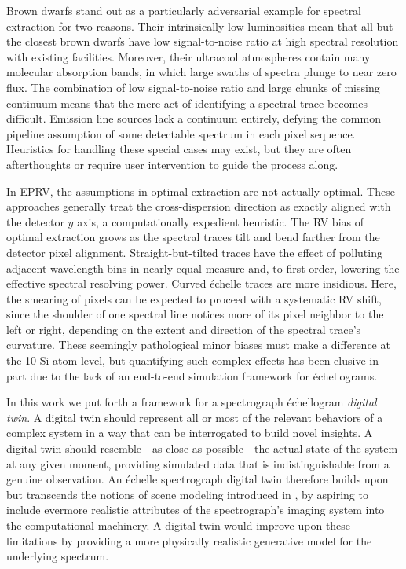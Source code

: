 \documentclass[twocolumn]{aastex63}
\begin{document}
Brown dwarfs stand out as a particularly adversarial example for spectral extraction for two reasons.  Their intrinsically low luminosities mean that all but the closest brown dwarfs have low signal-to-noise ratio at high spectral resolution with existing facilities.  Moreover, their ultracool atmospheres contain many molecular absorption bands, in which large swaths of spectra plunge to near zero flux.  The combination of low signal-to-noise ratio and large chunks of missing continuum means that the mere act of identifying a spectral trace becomes difficult. Emission line sources lack a continuum entirely, defying the common pipeline assumption of some detectable spectrum in each pixel sequence.  Heuristics for handling these special cases may exist, but they are often afterthoughts or require user intervention to guide the process along.

In EPRV, the assumptions in optimal extraction are not actually optimal.  These approaches generally treat the cross-dispersion direction as exactly aligned with the detector $y$ axis, a computationally expedient heuristic. The RV bias of optimal extraction grows as the spectral traces tilt and bend farther from the detector pixel alignment.  Straight-but-tilted traces have the effect of polluting adjacent wavelength bins in nearly equal measure and, to first order, lowering the effective spectral resolving power.  Curved \'echelle traces are more insidious.  Here, the smearing of pixels can be expected to proceed with a systematic RV shift, since the shoulder of one spectral line notices more of its pixel neighbor to the left or right, depending on the extent and direction of the spectral trace's curvature.  These seemingly pathological minor biases must make a difference at the 10 Si atom level, but quantifying such complex effects has been elusive in part due to the lack of an end-to-end simulation framework for \'echellograms.

In this work we put forth a framework for a spectrograph \'echellogram \emph{digital twin}.  A digital twin should represent all or most of the relevant behaviors of a complex system in a way that can be interrogated to build novel insights.  A digital twin should resemble---as close as possible---the actual state of the system at any given moment, providing simulated data that is indistinguishable from a genuine observation.  An \'echelle spectrograph digital twin therefore builds upon but transcends the notions of scene modeling introduced in \citet{2010PASP..122..248B}, by aspiring to include evermore realistic attributes of the spectrograph's imaging system into the computational machinery.  A digital twin would improve upon these limitations by providing a more physically realistic generative model for the underlying spectrum.
\end{document}

